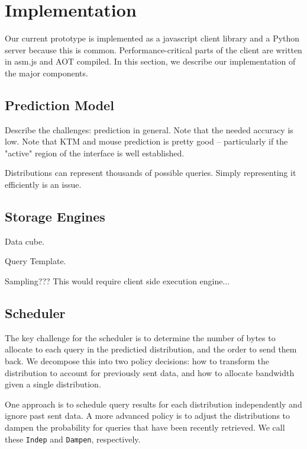 \section{Implementation}

Our current prototype is implemented as a javascript client library and a Python server because this is common.  Performance-critical parts of the client are written in asm.js and AOT compiled.
In this section, we describe our implementation of the major components.


\subsection{Prediction Model}

Describe the challenges: prediction in general.  Note that the needed accuracy is low.  Note that KTM and mouse prediction is pretty good -- particularly if the "active" region of the interface is well established.


Distributions can represent thousands of possible queries.  Simply representing it efficiently is an issue.

\subsection{Storage Engines}

Data cube.

Query Template.

Sampling???  This would require client side execution engine...


\subsection{Scheduler}

The key challenge for the scheduler is to determine the number of bytes to allocate to each query in the predictied distribution, and the order to send them back.  We decompose this into two policy decisions: how to transform the distribution to account for previously sent data, and how to allocate bandwidth given a single distribution.

  One approach is to schedule query results for each distribution independently and ignore past sent data.  A more advanced policy is to adjust the distributions to dampen the probability for queries that have been recently retrieved.  We call these \texttt{Indep} and \texttt{Dampen}, respectively.

